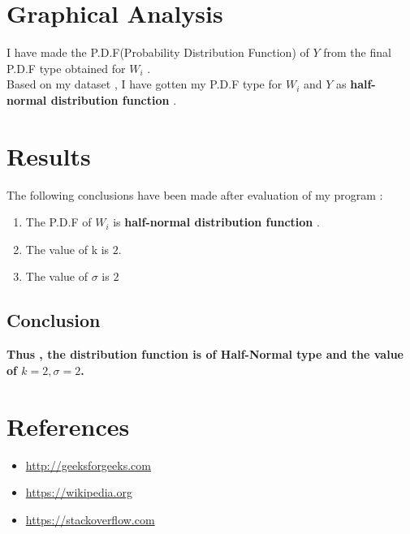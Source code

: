 \documentclass{article}
\begin{document}
\section{Graphical Analysis} 
\vspace{10pt}
I have made the P.D.F(Probability Distribution Function) of $Y$ from the final P.D.F type obtained for $W_i$ .
\vspace{5pt}
\\Based on my dataset , I have gotten my P.D.F type for $W_i$ and $Y$ as \textbf{half-normal distribution function} .
\vspace{20pt}
\newpage
\section{Results}
\vspace{20pt}
The following conclusions have been made after evaluation of my program : 
\begin{enumerate}
    \item The P.D.F of $W_i$ is \textbf{half-normal distribution function} .
    \item The value of k is $2$.
    \item The value of $\sigma$ is $2$
\end{enumerate}
\vspace{20pt}
\subsection*{Conclusion}
\textbf{Thus , the distribution function is of Half-Normal type and the value of $k=2,\sigma=2$.}
\newpage
\section{References}
\vspace{30pt}
\begin{itemize}
    \item \url{http://geeksforgeeks.com}
    \item \url{https://wikipedia.org}
    \item \url{https://stackoverflow.com}
\end{itemize}
\end{document}
